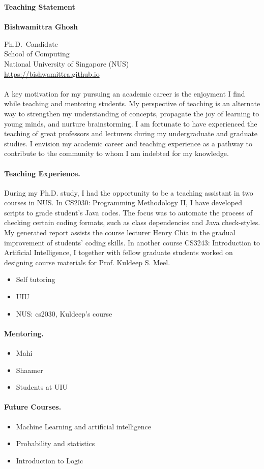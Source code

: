 \documentclass[11pt]{article}
\newcommand{\blue}[1]{\textcolor{blue}{#1}}
\begin{document}
	\noindent\huge \textbf{Teaching Statement} \\
	\vspace{0.1em}\\
	\Large \textbf{Bishwamittra Ghosh}
		
	\normalsize
	\noindent Ph.D.\ Candidate\\
	School of Computing\\
	National University of Singapore (NUS)\\
	\blue{\url{https://bishwamittra.github.io}}



	\paragraph{}
		A key motivation for my pursuing an academic career is the enjoyment I find while teaching and mentoring students. My perspective of teaching is an alternate way to strengthen my understanding of concepts, propagate the joy of learning to young minds, and nurture brainstorming. I am fortunate to have experienced the teaching of great professors and lecturers during my undergraduate and graduate studies. I envision my academic career and teaching experience as a pathway to contribute to the community to whom I am indebted for my knowledge.
	
	\paragraph{Teaching Experience.}
		During my Ph.D. study, I had the opportunity to be a teaching assistant in two courses in NUS. In CS2030: Programming Methodology II, I have developed scripts to grade student's Java codes. The focus was to automate the process of checking certain coding formats, such as class dependencies and Java check-styles. My generated report assists the course lecturer Henry Chia in the gradual improvement of students' coding skills. In another course CS3243: Introduction to Artificial Intelligence, I together with fellow graduate students worked on designing course materials for Prof. Kuldeep S. Meel. 
	
		\begin{itemize}
			\item Self tutoring
			\item UIU
			\item NUS: cs2030, Kuldeep's course
		\end{itemize}
	
	\paragraph{Mentoring.}
	
		\begin{itemize}
			\item Mahi
			\item Shaamer
			\item Students at UIU
		\end{itemize}

	
	\paragraph{Future Courses.}
		\begin{itemize}
			\item Machine Learning and artificial intelligence
			\item Probability and statistics
			\item Introduction to Logic
		\end{itemize}
\end{document}
